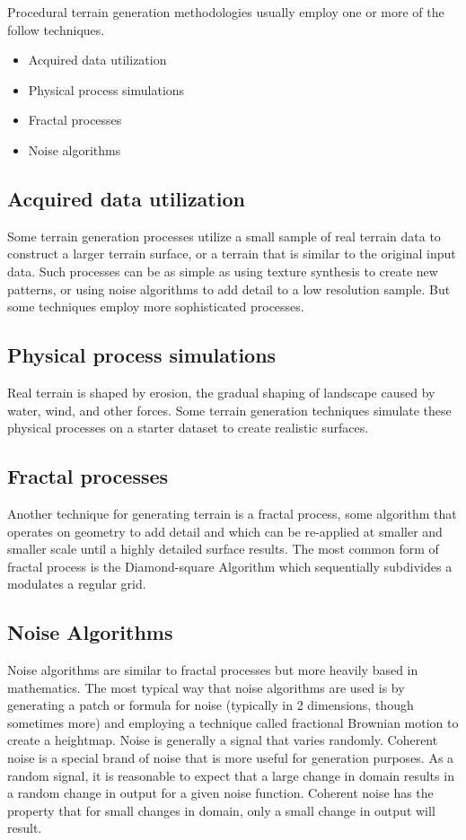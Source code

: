 Procedural terrain generation methodologies usually employ one or more of the follow techniques.
\begin{itemize}
\item Acquired data utilization
\item Physical process simulations
\item Fractal processes
\item Noise algorithms
\end{itemize}

\subsection{Acquired data utilization}

Some terrain generation processes utilize a small sample of real terrain data to construct a larger terrain surface, or a terrain that is similar to the original input data.
Such processes can be as simple as using texture synthesis to create new patterns, or using noise algorithms to add detail to a low resolution sample.
But some techniques employ more sophisticated processes. \cite{DEMsynthesis}

\subsection{Physical process simulations}

Real terrain is shaped by erosion, the gradual shaping of landscape caused by water, wind, and other forces.
Some terrain generation techniques simulate these physical processes on a starter dataset to create realistic surfaces. \cite{hydrology}

\subsection{Fractal processes}

Another technique for generating terrain is a fractal process, some algorithm that operates on geometry to add detail and which can be re-applied at smaller and smaller scale until a highly detailed surface results.
The most common form of fractal process is the Diamond-square Algorithm which sequentially subdivides a modulates a regular grid.

\subsection{Noise Algorithms}

Noise algorithms are similar to fractal processes but more heavily based in mathematics.
The most typical way that noise algorithms are used is by generating a patch or formula for noise (typically in 2 dimensions, though sometimes more) and employing a technique called fractional Brownian motion to create a heightmap.
Noise is generally a signal that varies randomly.
Coherent noise is a special brand of noise that is more useful for generation purposes.
As a random signal, it is reasonable to expect that a large change in domain results in a random change in output for a given noise function.
Coherent noise has the property that for small changes in domain, only a small change in output will result.

